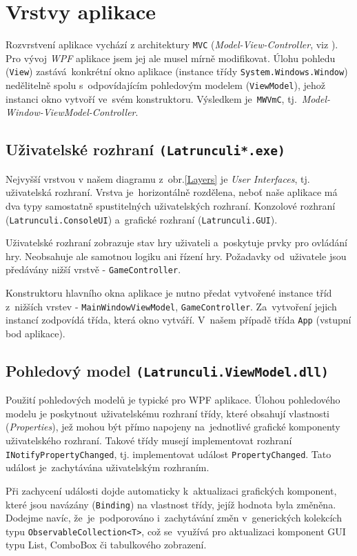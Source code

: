 \documentclass[12pt]{article}
\begin{document}
\section{Vrstvy aplikace}
Rozvrstvení aplikace vychází z architektury \texttt{MVC} (\emph{Model-View-Controller}, viz \cite{mvc}). Pro vývoj \emph{WPF} aplikace jsem jej ale musel mírně modifikovat. Úlohu pohledu (\texttt{View}) zastává~konkrétní okno aplikace (instance třídy \texttt{System.Windows.Window}) nedělitelně spolu s~odpovídajícím pohledovým modelem (\texttt{ViewModel}), jehož instanci okno vytvoří ve~svém konstruktoru. Výsledkem je~\texttt{MWVmC}, tj.~\emph{Model-Window-ViewModel-Controller}.

\subsection{Uživatelské rozhraní \texttt{(Latrunculi*.exe)}}
Nejvyšší vrstvou v našem diagramu z~obr.\ref{Layers} je \emph{User Interfaces}, tj. uživatelská rozhraní. Vrstva je~horizontálně rozdělena, neboť naše aplikace má dva typy samostatně spustitelných uživatelských rozhraní. Konzolové rozhraní (\texttt{Latrunculi.ConsoleUI}) a~grafické rozhraní (\texttt{Latrunculi.GUI}).

Uživatelské rozhraní zobrazuje stav hry uživateli a~poskytuje prvky pro ovládání hry. Neobsahuje ale samotnou logiku ani řízení hry. Požadavky od~uživatele jsou předávány nižší vrstvě - \texttt{GameController}.

Konstruktoru hlavního okna aplikace je nutno předat vytvořené instance tříd z~nižších vrstev - \texttt{MainWindowViewModel}, \texttt{GameController}. Za~vytvoření jejich instancí zodpovídá třída, která okno vytváří. V~našem případě třída \texttt{App} (vstupní bod aplikace).

\subsection{Pohledový model \texttt{(Latrunculi.ViewModel.dll)}}
Použití pohledových modelů je typické pro WPF aplikace. Úlohou pohledového modelu je poskytnout uživatelskému rozhraní třídy, které obsahují vlastnosti (\emph{Properties}), jež mohou být přímo napojeny na~jednotlivé grafické komponenty uživatelského rozhraní. Takové třídy musejí implementovat rozhraní \texttt{INotifyPropertyChanged}, tj. implementovat událost \texttt{PropertyChanged}. Tato událost je~zachytávána uživatelským rozhraním. 

Při zachycení události dojde automaticky  k~aktualizaci grafických komponent, které jsou navázány (\texttt{Binding})  na vlastnost třídy, jejíž hodnota byla změněna. Dodejme navíc, že~je~podporováno i~zachytávání změn v~generických kolekcích typu \texttt{ObservableCollection<T>}, což se~využívá pro aktualizaci komponent GUI typu List, ComboBox či tabulkového zobrazení.
\end{document}
